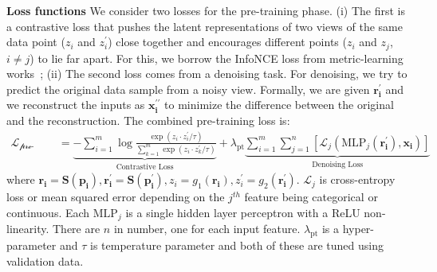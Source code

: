 \documentclass{article}
\begin{document}

\textbf{Loss functions} We consider two losses for the pre-training phase. (i) The first is a contrastive loss that pushes the latent representations of two views of the same data point ($z_i$ and $z_i^\prime$) close together and encourages different points ($z_i$ and $z_j$, $i\neq j$) to lie far apart.  For this, we borrow the InfoNCE loss from metric-learning works~\citep{sohn2016improved,oord2018representation,chen2020simple, wu2018unsupervised}; (ii) The second loss comes from a denoising task. For denoising, we try to predict the original data sample from a noisy view. Formally, we are given $\mathbf{r_i^\prime}$ and we reconstruct the inputs as $\mathbf{x_i^{\prime \prime}}$ to minimize the difference between the original and the reconstruction.%
The combined pre-training loss is:
\begin{align}
\mathcal{L_\text{pre-training}} &= \underbrace{-\sum_{i=1}^{m}{\log{\frac{\exp(z_i \cdot z_i^\prime/\tau)}{\sum_{k=1}^{m}{\exp(z_i \cdot z_k^\prime/\tau)}}}}}_{\text{Contrastive Loss}} + \lambda_{\text{pt}} \underbrace{\sum_{i=1}^{m}\sum_{j=1}^{n} [\mathcal{L}_j(\text{MLP}_j(\mathbf{r_i^\prime}),\mathbf{x_i})]}_{\text{Denoising Loss}}
\end{align}
where $\mathbf{r_i} = \mathbf{S}(\mathbf{p_i}), \mathbf{r_i^\prime} = \mathbf{S}(\mathbf{p_i^\prime}), z_i = g_1(\mathbf{r_i}),z_i^\prime = g_2(\mathbf{r_i^\prime}) $. $\mathcal{L}_j$ is cross-entropy loss or mean squared error depending on the $j^{th}$ feature being categorical or continuous. Each $\text{MLP}_j$ is a single hidden layer perceptron with a ReLU non-linearity. There are $n$ in number, one for each input feature. $\lambda_{\text{pt}}$ is a hyper-parameter and $\tau$ is temperature parameter and both of these are tuned using validation data.
\end{document}
